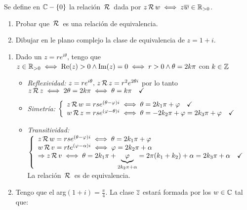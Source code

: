 

\ejercicio
Se define en $\complejos - \set{0}$ la relación $\relacion$ dada por $z \relacion w \sisolosi z \conj w \en \reales_{>0}$.
\begin{enumerate}[label=\roman*)]
	\item Probar que $\relacion$ es una relación de equivalencia.
	\item Dibujar en le plano complejo la clase de equivalencia de $z = 1 + i$.
\end{enumerate}

\separadorCorto

\begin{enumerate}[label=\roman*)]
	\item Dado un $z = r e^{i\theta}$, tengo que $z\en \reales_{>0} \sisolosi
		      \re(z) > 0 \y \im(z) = 0 \sisolosi
		      r > 0 \y \theta = 2k\pi$ con $k \en \enteros$
	      \begin{itemize}
		      \item  \textit{Reflexividad: } $z = r e^{i\theta},\, z \relacion z = r^2 e^{2\theta i}$ por lo tanto
		            $z \relacion z \sisolosi 2\theta = 2 k\pi \sisolosi \theta = k\pi \Tilde$

		      \item  \textit{Simetría: }
		            $\llave{l}{
				            z \relacion w = r s  e^{(\theta -\varphi )i} \sisolosi \theta = 2k_1\pi + \varphi \Tilde\\
				            w \relacion z = r s  e^{(\varphi - \theta )i} \sisolosi \theta = -2k_2\pi + \varphi = 2k_3\pi + \varphi  \Tilde
			            }$

		      \item  \textit{Transitividad: }
		            $\llave{l}{
				            z \relacion w = r s  e^{(\theta - \varphi )i} \sisolosi \theta = 2k_1\pi + \varphi \\
				            w \relacion v = r t  e^{(\varphi - \alpha )i} \sisolosi \varphi = 2k_2\pi + \alpha \\
				            \entonces z \relacion v \sisolosi \theta =  2k_1\pi + \ub{\varphi}{2k_2\pi + \alpha} = 2\pi(k_1 + k_2) + \alpha = 2k_3\pi + \alpha \Tilde
			            }$\\
		            La relación $\relacion$ es de equivalencia.
	      \end{itemize}

	\item
	      \begin{minipage}{0.7\textwidth}
		      Tengo que el arg$( 1 + i) = \frac{\pi}{4}$. La clase  $\clase z$ estará formada por los $w \en \complejos$ tal que:
	      \end{minipage}
	      \begin{minipage}{0.3\textwidth}
		      \begin{tikzpicture}[baseline=0, scale = 2, every node/.style={font=\tiny}]


\end{tikzpicture}
\end{minipage}
\end{enumerate}
